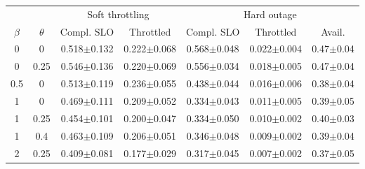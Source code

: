 \begin{tabular}{cc|cc|ccc}
\toprule
 & & \multicolumn{2}{c|}{Soft throttling} & \multicolumn{3}{c}{Hard outage}\\
$\beta$ & $\theta$ & Compl. SLO & Throttled & Compl. SLO & Throttled & Avail. \\
\midrule
0 & 0 & 0.518$\pm$0.132 & 0.222$\pm$0.068 & 0.568$\pm$0.048 & 0.022$\pm$0.004 & 0.47$\pm$0.04 \\
0 & 0.25 & 0.546$\pm$0.136 & 0.220$\pm$0.069 & 0.556$\pm$0.034 & 0.018$\pm$0.005 & 0.47$\pm$0.04 \\
0.5 & 0 & 0.513$\pm$0.119 & 0.236$\pm$0.055 & 0.438$\pm$0.044 & 0.016$\pm$0.006 & 0.38$\pm$0.04 \\
1 & 0 & 0.469$\pm$0.111 & 0.209$\pm$0.052 & 0.334$\pm$0.043 & 0.011$\pm$0.005 & 0.39$\pm$0.05 \\
1 & 0.25 & 0.454$\pm$0.101 & 0.200$\pm$0.047 & 0.334$\pm$0.050 & 0.010$\pm$0.002 & 0.40$\pm$0.03 \\
1 & 0.4 & 0.463$\pm$0.109 & 0.206$\pm$0.051 & 0.346$\pm$0.048 & 0.009$\pm$0.002 & 0.39$\pm$0.04 \\
2 & 0.25 & 0.409$\pm$0.081 & 0.177$\pm$0.029 & 0.317$\pm$0.045 & 0.007$\pm$0.002 & 0.37$\pm$0.05 \\
\bottomrule
\end{tabular}
